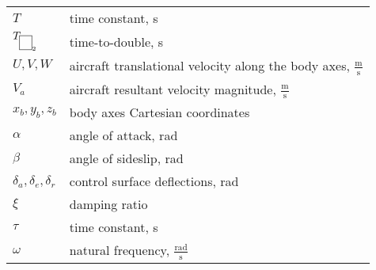 {\begin{longtable*}{@{}l @{\quad=\quad} l@{}}
		$T$ & time constant, s \\
		$T_{\pbox{1}_{2}}$ & time-to-double, s \\
		$U,V,W$ & aircraft translational velocity along the body axes, $\tfrac{\text{m}}{\text{s}}$ \\
		$V_{a}$ & aircraft resultant velocity magnitude, $\tfrac{\text{m}}{\text{s}}$ \\
		$x_{b}, y_{b}, z_{b}$ & body axes Cartesian coordinates \\
		$\alpha$ & angle of attack, rad \\
		$\beta$ & angle of sideslip, rad \\
		$\delta_{a}, \delta_{e}, \delta_{r}$ & control surface deflections, rad \\
		$\xi$ & damping ratio \\
		$\tau$ & time constant, s \\
		$\omega$ & natural frequency, $\tfrac{\text{rad}}{\text{s}}$ \\
\end{longtable*}}
